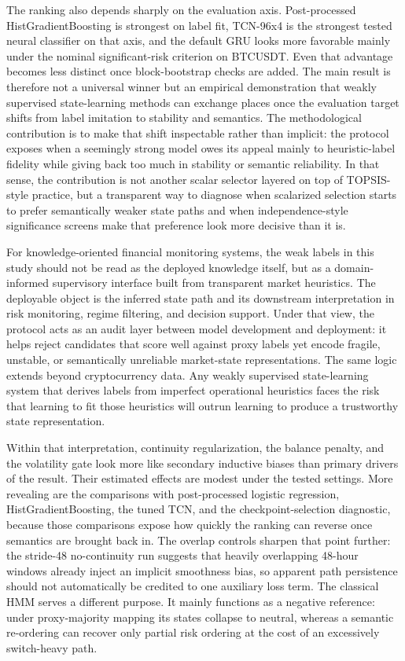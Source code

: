 \documentclass[a4paper,fleqn]{cas-dc}
\begin{document}
The ranking also depends sharply on the evaluation axis. Post-processed HistGradientBoosting is strongest on label fit, TCN-96x4 is the strongest tested neural classifier on that axis, and the default GRU looks more favorable mainly under the nominal significant-risk criterion on BTCUSDT. Even that advantage becomes less distinct once block-bootstrap checks are added. The main result is therefore not a universal winner but an empirical demonstration that weakly supervised state-learning methods can exchange places once the evaluation target shifts from label imitation to stability and semantics. The methodological contribution is to make that shift inspectable rather than implicit: the protocol exposes when a seemingly strong model owes its appeal mainly to heuristic-label fidelity while giving back too much in stability or semantic reliability. In that sense, the contribution is not another scalar selector layered on top of TOPSIS-style practice, but a transparent way to diagnose when scalarized selection starts to prefer semantically weaker state paths and when independence-style significance screens make that preference look more decisive than it is.

For knowledge-oriented financial monitoring systems, the weak labels in this study should not be read as the deployed knowledge itself, but as a domain-informed supervisory interface built from transparent market heuristics. The deployable object is the inferred state path and its downstream interpretation in risk monitoring, regime filtering, and decision support. Under that view, the protocol acts as an audit layer between model development and deployment: it helps reject candidates that score well against proxy labels yet encode fragile, unstable, or semantically unreliable market-state representations. The same logic extends beyond cryptocurrency data. Any weakly supervised state-learning system that derives labels from imperfect operational heuristics faces the risk that learning to fit those heuristics will outrun learning to produce a trustworthy state representation.

Within that interpretation, continuity regularization, the balance penalty, and the volatility gate look more like secondary inductive biases than primary drivers of the result. Their estimated effects are modest under the tested settings. More revealing are the comparisons with post-processed logistic regression, HistGradientBoosting, the tuned TCN, and the checkpoint-selection diagnostic, because those comparisons expose how quickly the ranking can reverse once semantics are brought back in. The overlap controls sharpen that point further: the stride-48 no-continuity run suggests that heavily overlapping 48-hour windows already inject an implicit smoothness bias, so apparent path persistence should not automatically be credited to one auxiliary loss term. The classical HMM serves a different purpose. It mainly functions as a negative reference: under proxy-majority mapping its states collapse to neutral, whereas a semantic re-ordering can recover only partial risk ordering at the cost of an excessively switch-heavy path.
\end{document}
